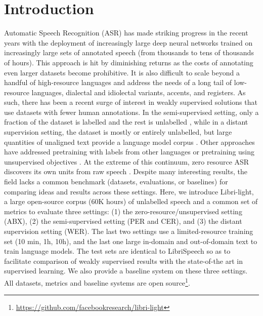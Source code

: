 \documentclass{article}
\def\LL{Libri-light}
\begin{document}
\section{Introduction}
\label{sec:intro}
\vspace{-2mm}
Automatic Speech Recognition (ASR) has made striking progress in the recent years with the deployment of increasingly large deep neural networks trained on increasingly large sets of annotated speech (from thousands to tens of thousands of hours). This approach is hit by diminishing returns as the costs of annotating even larger datasets become  prohibitive. It is also difficult to scale beyond a handful of high-resource languages and address the needs of a long tail of low-resource languages, dialectal and idiolectal variants, accents, and registers. As such, there has been a recent surge of interest in weakly supervised solutions that use datasets with fewer human annotations. In the semi-supervised setting, only a fraction of the dataset is labelled and the rest is unlabelled \cite{tur2005,kahn2019self}, while in a distant supervision setting, the dataset is mostly or entirely unlabelled, but large quantities of unaligned text provide a language model corpus \cite{chen2018almost,chung2018}. Other approaches have addressed pretraining with labels from other languages \cite{huang2013cross,vesely2012language} or pretraining using unsupervised objectives \cite{vandenoord2018,schneider2019wav2vec}. At the extreme of this continuum, zero resource ASR discovers its own units from raw speech \cite{Versteegh2016,dunbar2017,dunbar2019}. Despite many interesting results, 
the field lacks a common benchmark (datasets, evaluations, or baselines) for comparing ideas and results across these settings. Here, we introduce \LL{}, a large open-source corpus (60K hours) of unlabelled speech and a common set of metrics to evaluate three settings: (1) the zero-resource/unsupervised setting (ABX), (2) the semi-supervised setting (PER and CER), and (3) the distant supervision setting (WER). The last two settings use a limited-resource training set (10 min, 1h, 10h), and the last one large in-domain and out-of-domain text to train language models. The test sets are identical to LibriSpeech \cite{librispeech2015} so as to facilitate comparison of weakly supervised results with the state-of-the art in supervised learning. We also provide a baseline system on these three settings. All datasets, metrics and baseline systems are open source\footnote{\url{https://github.com/facebookresearch/libri-light}}.
\end{document}
